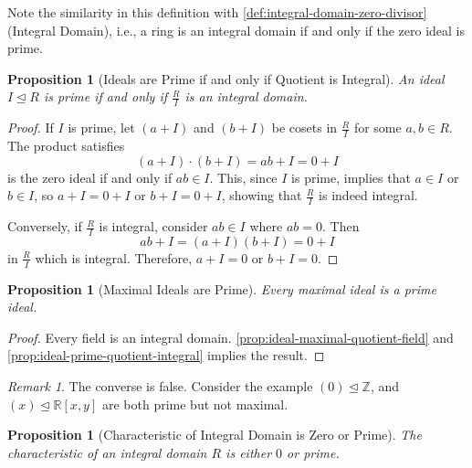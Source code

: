 \documentclass{article}
\newtheorem{proposition}[theorem]{Proposition}
\theoremstyle{definition}
\theoremstyle{remark}
\newtheorem{remark}[theorem]{Remark}
\newcommand{\pqty}[1]{\left(#1\right)}
\newcommand{\bqty}[1]{\left[#1\right]}
\newcommand{\flatfrac}[2]{\frac{#1}{#2}}
\newcommand{\idealsub}{\trianglelefteq}
\newcommand{\ZZ}{\mathbb{Z}}
\newcommand{\RR}{\mathbb{R}}
\begin{document}
Note the similarity in this definition with \autoref{def:integral-domain-zero-divisor} (Integral Domain), i.e., a ring is an integral domain if and only if the zero ideal is prime.

\begin{proposition}[Ideals are Prime if and only if Quotient is Integral]
    \label{prop:ideal-prime-quotient-integral}%
    An ideal \(I \idealsub R\) is prime if and only if \(\flatfrac{R}{I}\) is an integral domain.
\end{proposition}

\begin{proof}
    If \(I\) is prime, let \(\pqty{a + I}\) and \(\pqty{b + I}\) be cosets in \(\flatfrac{R}{I}\) for some \(a, b \in R\). The product satisfies
    \[
        \pqty{a + I} \cdot \pqty{b + I} = ab + I = 0 + I
    \]
    is the zero ideal if and only if \(ab \in I\). This, since \(I\) is prime, implies that \(a \in I\) or \(b \in I\), so \(a + I = 0 + I\) or \(b + I = 0 + I\), showing that \(\flatfrac{R}{I}\) is indeed integral.

    Conversely, if \(\flatfrac{R}{I}\) is integral, consider \(ab \in I\) where \(ab = 0\). Then
    \[
        ab + I = \pqty{a + I} \pqty{b + I} = 0 + I
    \]
    in \(\flatfrac{R}{I}\) which is integral. Therefore, \(a + I = 0\) or \(b + I = 0\).
\end{proof}

\begin{proposition}[Maximal Ideals are Prime]
    \label{prop:maximal-ideal-prime}%
    Every maximal ideal is a prime ideal.
\end{proposition}

\begin{proof}
    Every field is an integral domain. \autoref{prop:ideal-maximal-quotient-field} and \autoref{prop:ideal-prime-quotient-integral} implies the result.
\end{proof}

\begin{remark}
    The converse is false. Consider the example \(\pqty{0} \idealsub \ZZ\), and \(\pqty{x} \idealsub \RR\bqty{x, y}\) are both prime but not maximal.
\end{remark}

\begin{proposition}[Characteristic of Integral Domain is Zero or Prime]
    \label{prop:characteristic-integral-domain}%
    The characteristic of an integral domain \(R\) is either \(0\) or prime.
\end{proposition}
\end{document}
